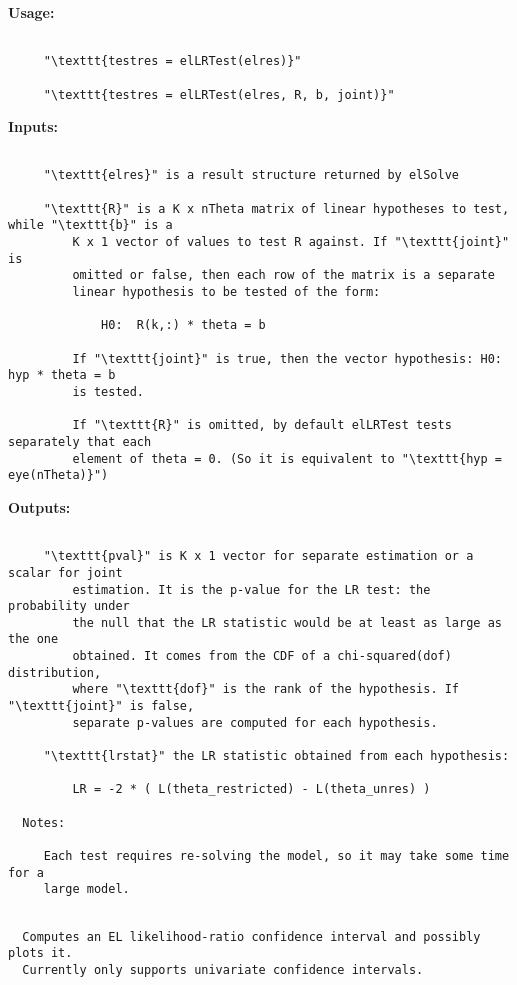 {\small\textbf{Usage:}}
\begin{lstlisting}
 
     "\texttt{testres = elLRTest(elres)}"
  
     "\texttt{testres = elLRTest(elres, R, b, joint)}"
 \end{lstlisting}
{\small\textbf{Inputs:}}
\begin{lstlisting}
 
     "\texttt{elres}" is a result structure returned by elSolve
 
     "\texttt{R}" is a K x nTheta matrix of linear hypotheses to test, while "\texttt{b}" is a
         K x 1 vector of values to test R against. If "\texttt{joint}" is
         omitted or false, then each row of the matrix is a separate
         linear hypothesis to be tested of the form:
 
             H0:  R(k,:) * theta = b
 
         If "\texttt{joint}" is true, then the vector hypothesis: H0: hyp * theta = b
         is tested.
 
         If "\texttt{R}" is omitted, by default elLRTest tests separately that each
         element of theta = 0. (So it is equivalent to "\texttt{hyp = eye(nTheta)}")
 \end{lstlisting}
{\small\textbf{Outputs:}}
\begin{lstlisting}
 
     "\texttt{pval}" is K x 1 vector for separate estimation or a scalar for joint
         estimation. It is the p-value for the LR test: the probability under
         the null that the LR statistic would be at least as large as the one
         obtained. It comes from the CDF of a chi-squared(dof) distribution,
         where "\texttt{dof}" is the rank of the hypothesis. If "\texttt{joint}" is false,
         separate p-values are computed for each hypothesis.
 
     "\texttt{lrstat}" the LR statistic obtained from each hypothesis:
 
         LR = -2 * ( L(theta_restricted) - L(theta_unres) )
 
  Notes:
 
     Each test requires re-solving the model, so it may take some time for a
     large model.
 

\end{lstlisting}
\begin{lstlisting}
  Computes an EL likelihood-ratio confidence interval and possibly plots it.
  Currently only supports univariate confidence intervals.
 \end{lstlisting}
